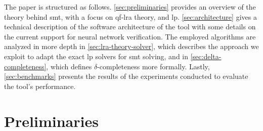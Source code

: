 \documentclass[runningheads]{llncs}
\begin{document}
The paper is structured as follows.
\autoref{sec:preliminaries} provides an overview of the theory behind \gls{smt}, with a focus on \gls{qf-lra} theory, and \gls{lp}.
\autoref{sec:architecture} gives a technical description of the software architecture of the tool with some details on the current support for neural network verification.
The employed algorithms are analyzed in more depth in \autoref{sec:lra-theory-solver}, which describes the approach we exploit to adapt the exact \gls{lp} solvers for \gls{smt} solving, and in \autoref{sec:delta-completeness}, which defines $\delta$-completeness more formally.
Lastly, \autoref{sec:benchmarks} presents the results of the experiments conducted to evaluate the tool's performance.

\section{Preliminaries}
\label{sec:preliminaries}
\end{document}
